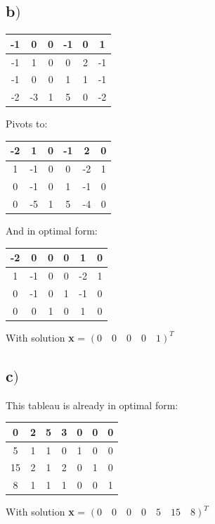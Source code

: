 \documentclass[a4paper,12pt]{article}
\begin{document}
\subsection*{b\()\)}
\begin{center}
\begin{tabular}{| c | c  c  c  c  c |}
\hline
-1 & 0 & 0 & -1 & 0 & 1\\
\hline
-1 & 1 & 0 & 0 & 2 & -1\\
-1 & 0 & 0 & 1 & 1 & -1\\
-2 & -3 & 1 & 5 & 0 & -2\\
\hline
\end{tabular}
\end{center}
Pivots to:
\begin{center}
\begin{tabular}{| c | c  c  c  c  c |}
\hline
-2 & 1 & 0 & -1 & 2 & 0\\
\hline
1 & -1 & 0 & 0 & -2 & 1\\
0 & -1 & 0 & 1 & -1 & 0\\
0 & -5 & 1 & 5 & -4 & 0\\
\hline
\end{tabular}
\end{center}
And in optimal form:
\begin{center}
\begin{tabular}{| c | c  c  c  c  c |}
\hline
-2 & 0 & 0 & 0 & 1 & 0\\
\hline
1 & -1 & 0 & 0 & -2 & 1\\
0 & -1 & 0 & 1 & -1 & 0\\
0 & 0 & 1 & 0 & 1 & 0\\
\hline
\end{tabular}
\end{center}
With solution {\bf x} = \( (0 \quad 0 \quad 0 \quad 0 \quad 1)^T \)
\subsection*{c\()\)}
This tableau is already in optimal form:
\begin{center}
\begin{tabular}{| c | c  c  c  c  c  c |}
\hline
0 & 2 & 5 & 3 & 0 & 0 & 0\\
\hline
5 & 1 & 1 & 0 & 1 & 0 & 0\\
15 & 2 & 1 & 2 & 0 & 1 & 0\\
8 & 1 & 1 & 1 & 0 & 0 & 1\\
\hline
\end{tabular}
\end{center}
With solution {\bf x} = \( (0 \quad 0 \quad 0 \quad 0 \quad 5 \quad 15 \quad 8)^T \)
\end{document}

